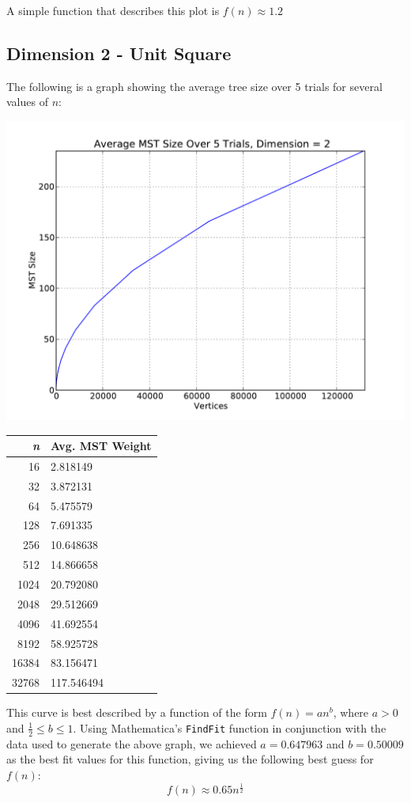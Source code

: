 \documentclass[solution, letterpaper]{cs121}
\begin{document}
A simple function that describes this plot is $f(n) \approx 1.2$

\subsection*{Dimension 2 - Unit Square}

The following is a graph showing the average tree size over 5 trials for several values of $n$:
\begin{center}
\includegraphics[scale=0.6]{graphs/kruskals-dimension-2.pdf}
\begin{tabular}{ | r | l |}
\hline
\bf{\itshape{n}} & \bf{Avg. MST Weight} \\
\hline
16 & 2.818149 \\
\hline
32 & 3.872131 \\
\hline
64 & 5.475579 \\
\hline
128 & 7.691335 \\
\hline
256 & 10.648638 \\
\hline
512 & 14.866658 \\
\hline
1024 & 20.792080 \\
\hline
2048 & 29.512669 \\
\hline
4096 & 41.692554 \\
\hline
8192 & 58.925728 \\
\hline
16384 & 83.156471\\
\hline
32768 & 117.546494\\
\hline
\end{tabular}
\end{center}

This curve is best described by a function of the form $f(n)=an^b$, where $a > 0$ and $\frac{1}{2} \leq b \leq 1$. Using Mathematica's {\tt FindFit} function in conjunction with the data used to generate the above graph, we achieved $a=0.647963$ and $b=0.50009$ as the best fit values for this function, giving us the following best guess for $f(n)$:
\[f(n) \approx 0.65 n^{\frac{1}{2}}\]
\end{document}
